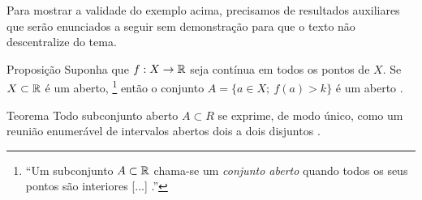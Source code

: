 		Para mostrar a validade do exemplo acima, precisamos de resultados auxiliares que serão enunciados a seguir sem demonstração para que o texto não descentralize do tema.
		\vspace{-0.2cm}
	\begin{env}{Proposição}
	\label{cit:função-continua-mensuravel}
		Suponha que $f:X \to \mathbb{R}$ seja contínua em todos os pontos de $X$.
		Se $X \subset \mathbb{R}$ é um aberto, 
		\footnote{\enquote{Um subconjunto $A \subset \mathbb{R}$ chama-se um \textit{conjunto aberto} quando
			todos os seus pontos são interiores [...] \cite[p.164]{elon}.}}
		então o conjunto $A = \{a \in X;\ f(a)>k\}$ é um aberto \cite[p.226]{elon}.
		\vspace{-0.2cm}
	\end{env}
	\begin{env}{Teorema}
		\label{teo:estrutura-abertos-reta}
		Todo subconjunto aberto $A \subset R$ se exprime, de modo único, como um reunião enumerável de intervalos abertos dois a dois disjuntos \cite[p.167]{elon}.
		\vspace{-0.2cm}
	\end{env}

